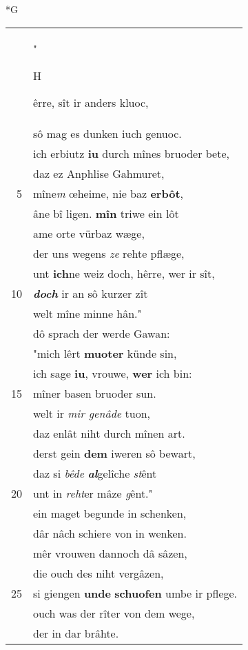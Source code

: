 \documentclass[8pt,a4paper,notitlepage]{article}
\begin{document}
\begin{table}[ht]
\begin{minipage}[t]{0.5\linewidth}
\small
\begin{center}*G
\end{center}
\begin{tabular}{rl}
 & "\begin{large}H\end{large}êrre, sît ir anders kluoc,\\ 
 & sô mag es dunken iuch genuoc.\\ 
 & ich erbiutz \textbf{iu} durch mînes bruoder bete,\\ 
 & daz ez Anphlise Gahmuret,\\ 
5 & mîne\textit{m} œheime, nie baz \textbf{erbôt},\\ 
 & âne bî ligen. \textbf{mîn} triwe ein lôt\\ 
 & ame orte vürbaz wæge,\\ 
 & der uns wegens \textit{ze} rehte pflæge,\\ 
 & unt \textbf{ich}ne weiz doch, hêrre, wer ir sît,\\ 
10 & \textit{\textbf{doch}} ir an sô kurzer zît\\ 
 & welt mîne minne hân."\\ 
 & dô sprach der werde Gawan:\\ 
 & "mich lêrt \textbf{muoter} künde sin,\\ 
 & ich sage \textbf{iu}, vrouwe, \textbf{wer} ich bin:\\ 
15 & mîner basen bruoder sun.\\ 
 & welt ir \textit{mir genâde} tuon,\\ 
 & daz enlât niht durch mînen art.\\ 
 & derst gein \textbf{dem} iweren sô bewart,\\ 
 & daz si \textit{bêde} \textit{\textbf{al}}gelîche \textit{st}ênt\\ 
20 & unt in \textit{reht}er mâze \textit{g}ênt."\\ 
 & ein maget begunde in schenken,\\ 
 & dâr nâch schiere von in wenken.\\ 
 & mêr vrouwen dannoch dâ sâzen,\\ 
 & die ouch des niht vergâzen,\\ 
25 & si giengen \textbf{unde} \textbf{schuofen} umbe ir pflege.\\ 
 & ouch was der rîter von dem wege,\\ 
 & der in dar brâhte.\\ 

\end{tabular}
\end{minipage}
\end{table}
\end{document}
